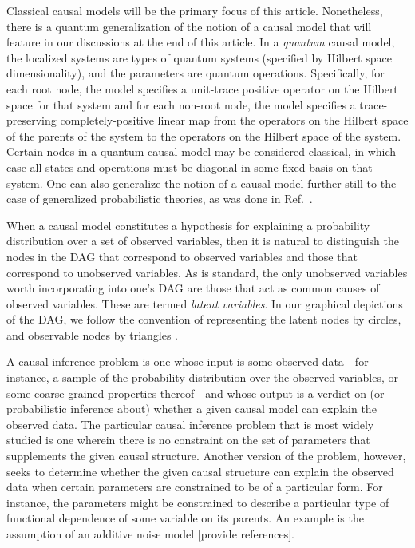 {Classical causal models will be the primary focus of this article. Nonetheless, there is a quantum generalization of the notion of a causal model that will feature in our discussions at the end of this article.  In a {\em quantum} causal model\cite{leifer2013conditionalstates}, the localized systems are types of quantum systems (specified by Hilbert space dimensionality), and the parameters are quantum operations.  Specifically, for each root node, the model specifies a unit-trace positive operator on the Hilbert space for that system and for each non-root node, the model specifies a trace-preserving completely-positive linear map from the operators on the Hilbert space of the parents of the system to the operators on the Hilbert space of the system.  Certain nodes in a quantum causal model may be considered classical, in which case all states and operations must be diagonal in some fixed basis on that system.  One can also generalize the notion of a causal model further still to the case of generalized probabilistic theories, as was done in Ref.~\cite{pusey2014gdag}.

When a causal model constitutes a hypothesis for explaining a probability distribution over a set of observed variables, then it is natural to distinguish the nodes in the DAG that correspond to observed variables and those that correspond to unobserved variables.  As is standard, the only unobserved variables worth incorporating into one's DAG are those that act as common causes of observed variables.  These are termed {\em latent variables}.  In our graphical depictions of the DAG, we follow the convention of representing the latent nodes by circles, and observable nodes by triangles \cite{pusey2014gdag}.

A causal inference problem is one whose input is some observed data---for instance, a sample of the probability distribution over the observed variables, or some coarse-grained properties thereof---and whose output is a verdict on (or probabilistic inference about) whether a given causal model can explain the observed data.   The particular causal inference problem that is most widely studied is one wherein there is no constraint on the set of parameters that supplements the given causal structure.  Another version of the problem, however, seeks to determine whether the given causal structure can explain the observed data when certain parameters are constrained to be of a particular form.  For instance, the parameters might be constrained to describe a particular type of functional dependence of some variable on its parents.  An example is the assumption of an additive noise model [provide references].

}
